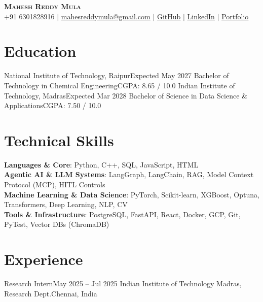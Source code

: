 \documentclass[letterpaper,10pt]{article}
\begin{document}
\begin{center}
    \textbf{\Huge \scshape Mahesh Reddy Mula} \\ \vspace{2pt}
    \small +91 6301828916 $|$ \href{mailto:mahesreddymula@gmail.com}{\underline{mahesreddymula@gmail.com}} $|$ 
    \href{https://github.com/mahes-reddy332}{\underline{GitHub}} $|$
    \href{https://www.linkedin.com/in/mahesh-reddy-mula-369z/}{\underline{LinkedIn}} $|$
    \href{https://mahes-reddy332.github.io/freelance-portfolio}{\underline{Portfolio}}
\end{center}

\section{Education}
  \resumeSubHeadingListStart
    \resumeSubheading
      {National Institute of Technology, Raipur}{Expected May 2027}
      {Bachelor of Technology in Chemical Engineering}{CGPA: 8.65 / 10.0}
    \resumeSubheading
      {Indian Institute of Technology, Madras}{Expected Mar 2028}
      {Bachelor of Science in Data Science \& Applications}{CGPA: 7.50 / 10.0}
  \resumeSubHeadingListEnd

\section{Technical Skills}
 \begin{itemize}[leftmargin=0.15in, label={}]
    \small{\item{
     \textbf{Languages \& Core}{: Python, C++, SQL, JavaScript, HTML} \\
     \textbf{Agentic AI \& LLM Systems}{: LangGraph, LangChain, RAG, Model Context Protocol (MCP), HITL Controls} \\
     \textbf{Machine Learning \& Data Science}{: PyTorch, Scikit-learn, XGBoost, Optuna, Transformers, Deep Learning, NLP, CV} \\
     \textbf{Tools \& Infrastructure}{: PostgreSQL, FastAPI, React, Docker, GCP, Git, PyTest, Vector DBs (ChromaDB)}
    }}
 \end{itemize}

\section{Experience}
  \resumeSubHeadingListStart
    \resumeSubheading
      {Research Intern}{May 2025 -- Jul 2025}
      {Indian Institute of Technology Madras, Research Dept.}{Chennai, India}
      \resumeItemListStart
      \resumeItemListEnd
  \resumeSubHeadingListEnd
\end{document}
